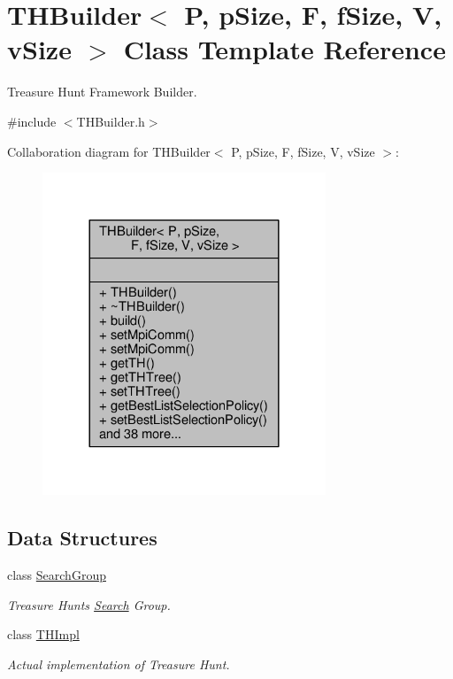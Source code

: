 \hypertarget{classTHBuilder}{}\section{T\+H\+Builder$<$ P, p\+Size, F, f\+Size, V, v\+Size $>$ Class Template Reference}
\label{classTHBuilder}


Treasure Hunt Framework Builder.  




{\ttfamily \#include $<$T\+H\+Builder.\+h$>$}



Collaboration diagram for T\+H\+Builder$<$ P, p\+Size, F, f\+Size, V, v\+Size $>$\+:
\nopagebreak
\begin{figure}[H]
\begin{center}
\leavevmode
\includegraphics[width=240pt]{classTHBuilder__coll__graph}
\end{center}
\end{figure}
\subsection*{Data Structures}
\begin{DoxyCompactItemize}
\item 
class \hyperlink{classTHBuilder_1_1SearchGroup}{Search\+Group}
\begin{DoxyCompactList}\small\item\em Treasure Hunt\textquotesingle{}s \hyperlink{classSearch}{Search} Group. \end{DoxyCompactList}\item 
class \hyperlink{classTHBuilder_1_1THImpl}{T\+H\+Impl}
\begin{DoxyCompactList}\small\item\em Actual implementation of Treasure Hunt. \end{DoxyCompactList}\end{DoxyCompactItemize}
